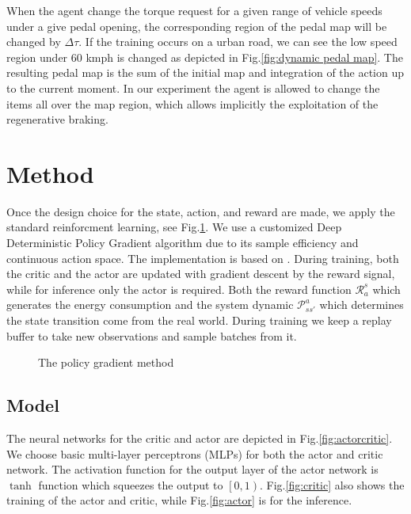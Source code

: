 \documentclass[conference]{IEEEtran}
\begin{document}
When the agent change the torque request for a given range of vehicle speeds under a give pedal opening, the corresponding region of the pedal map will be changed by $\Delta\tau$. If the training occurs on a urban road, we can see the low speed region under 60 kmph is changed as depicted in Fig.\ref{fig:dynamic pedal map}. The resulting pedal map is the sum of the initial map and integration of the action up to the current moment. In our experiment the agent is allowed to change the items all over the map region, which allows implicitly the exploitation of the regenerative braking.

\section{Method}\label{sec:method}

Once the design choice for the state, action, and reward are made, we apply the standard reinforcment learning, see Fig.\@\ref{fig:policy gradient}. We use a customized Deep Deterministic Policy Gradient algorithm \parencite{lillicrap15:_contin} due to its sample efficiency and continuous action space. The implementation is based on \parencite{keras20:DDPG}. During training, both the critic and the actor are updated with gradient descent by the reward signal, while for inference only the actor is required. Both the reward function $\mathcal{R}_a^s$ which generates the energy consumption and the system dynamic $\mathcal{P}_{ss'}^{a}$ which determines the state transition come from the real world. During training we keep a replay buffer to take new observations and sample batches from it.

\begin{figure}[ht]
	\centering
	\def\svgwidth{0.8\columnwidth}
	
	\caption{\label{fig:rl_model} The policy gradient method}\label{fig:policy gradient}
\end{figure}

\subsection{Model}\label{sec:model}

The neural networks for the critic and actor are depicted in Fig.\@\ref{fig:actorcritic}. We choose basic multi-layer perceptrons (MLPs) for both the actor and critic network. The activation function for the output layer of the actor network is $\tanh$ function which squeezes the output to $\left[0,1\right)$. Fig.\@\ref{fig:critic} also shows the training of the actor and critic, while Fig.\@\ref{fig:actor} is for the inference.
\end{document}

